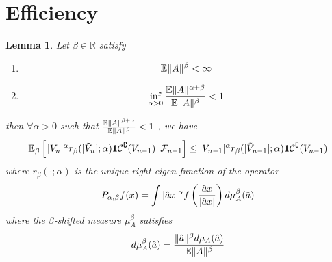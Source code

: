 \documentclass{article}
\newtheorem{lemma}{Lemma}
\theoremstyle{remark}
\begin{document}
\section{Efficiency}\label{sec:efficiency}
\begin{lemma}
  Let $\beta \in \mathbb R$ satisfy
  \begin{enumerate}
  \item
    \begin{equation}
      \label{eq:drift_cond1}
      \mathbb{E} \|A\|^\beta < \infty      
    \end{equation}
  \item 
    \begin{equation}
      \label{eq:drift_cond2}
    \inf_{\alpha > 0} {\mathbb{E} \|A\|^{\alpha + \beta}
      \over 
      \mathbb{E} \|A\|^{\beta}
    } < 1
    \end{equation}
  \end{enumerate}
  then $\forall \alpha > 0$ such that $\frac{\mathbb{E}\|A\|^{\beta +
      \alpha}}{\mathbb{E}\|A\|^\beta} < 1$ , we have
  \begin{equation}
    \label{eq:drift}
    \mathbb{E}_\beta \left[\left.
        |V_n|^\alpha r_\beta(|\tilde V_n|; \alpha) \mathbf{1}{{\mathcal C}^\complement}(V_{n-1}) \right|
      \mathcal F_{n-1} \right] \leq |V_{n-1}|^\alpha r_\beta(|\tilde
    V_{n-1}|; \alpha) \mathbf{1}{{\mathcal C}^\complement}(V_{n-1})
  \end{equation}
  where $r_\beta(\cdot; \alpha)$ is the unique right eigen function of the
  operator
  \[
  P_{\alpha, \beta} f(x) = \int |\hat a x|^\alpha f\left(
    {\hat a x \over |\hat a x|}
  \right) d\mu_A^\beta(\hat a)
  \]
  where the $\beta$-shifted measure $\mu_A^\beta$ satisfies
  \[
  d\mu_A^\beta(\hat a) = {\|\hat a\|^\beta d\mu_A(\hat a) \over \mathbb{E}\|A\|^\beta}
  \]
\end{lemma}
\end{document}
